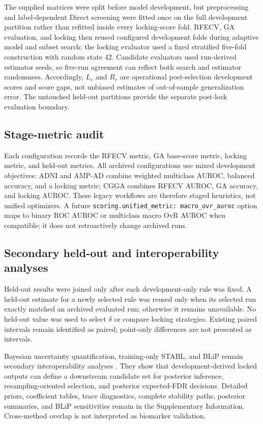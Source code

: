 The supplied matrices were split before model development, but preprocessing and label-dependent Direct screening were fitted once on the full development partition rather than refitted inside every locking-score fold. RFECV, GA evaluation, and locking then reused configured development folds during adaptive model and subset search; the locking evaluator used a fixed stratified five-fold construction with random state 42. Candidate evaluators used run-derived estimator seeds, so five-run agreement can reflect both search and estimator randomness. Accordingly, \(L_r\) and \(R_r\) are operational post-selection development scores and score gaps, not unbiased estimates of out-of-sample generalization error. The untouched held-out partitions provide the separate post-lock evaluation boundary.

\subsection{Stage-metric audit}

Each configuration records the RFECV metric, GA base-score metric, locking metric, and held-out metrics. All archived configurations use mixed development objectives: ADNI and AMP-AD combine weighted multiclass AUROC, balanced accuracy, and a locking metric; CGGA combines RFECV AUROC, GA accuracy, and locking AUROC. These legacy workflows are therefore staged heuristics, not unified optimizers. A future \texttt{scoring.unified\_metric: macro\_ovr\_auroc} option maps to binary ROC AUROC or multiclass macro OvR AUROC when compatible; it does not retroactively change archived runs.

\subsection{Secondary held-out and interoperability analyses}

Held-out results were joined only after each development-only rule was fixed. A held-out estimate for a newly selected rule was reused only when its selected run exactly matched an archived evaluated run; otherwise it remains unavailable. No held-out value was used to select \(\delta\) or compare locking strategies. Existing paired intervals remain identified as paired; point-only differences are not presented as intervals.

Bayesian uncertainty quantification, training-only STABL, and BLiP remain secondary interoperability analyses \citep{ref25,ref30,ref32,ref33,ref34}. They show that development-derived locked outputs can define a downstream candidate set for posterior inference, resampling-oriented selection, and posterior expected-FDR decisions. Detailed priors, coefficient tables, trace diagnostics, complete stability paths, posterior summaries, and BLiP sensitivities remain in the Supplementary Information. Cross-method overlap is not interpreted as biomarker validation.

